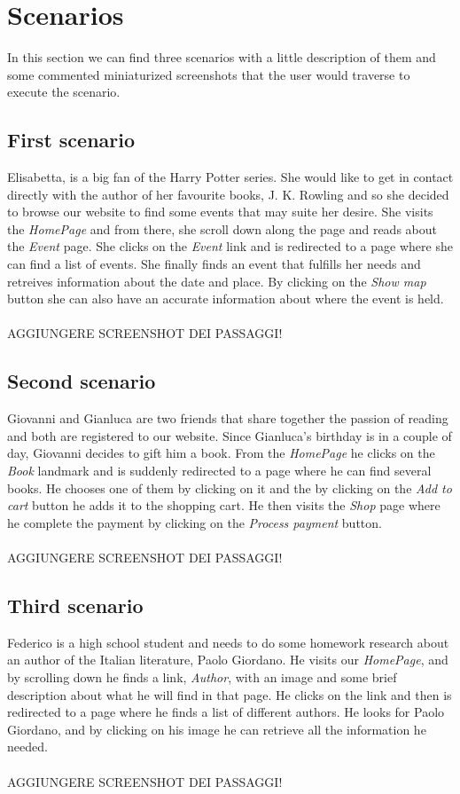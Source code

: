 \documentclass[12pt,a4paper]{article}
\begin{document}
\newpage
\section{Scenarios}
In this section we can find three scenarios with a little description of them and some commented miniaturized screenshots that the user would traverse to execute the scenario.
\subsection{First scenario}
Elisabetta, is a big fan of the Harry Potter series. She would like to get in contact directly with the author of her favourite books, J. K. Rowling and so she decided to browse our website to find some events that may suite her desire. She visits the \textit{HomePage} and from there, she scroll down along the page and reads about the \textit{Event} page. She clicks on the \textit{Event} link and is redirected to a page where she can find a list of events. She finally finds an event that fulfills her needs and retreives information about the date and place. By clicking on the \textit{Show map} button she can also have an accurate information about where the event is held.\\\\
AGGIUNGERE SCREENSHOT DEI PASSAGGI!
\subsection{Second scenario}
Giovanni and Gianluca are two friends that share together the passion of reading and both are registered to our website. Since Gianluca's birthday is in a couple of day, Giovanni decides to gift him a book. From the \textit{HomePage} he clicks on the \textit{Book} landmark and is suddenly redirected to a page where he can find several books. He chooses one of them by clicking on it and the by clicking on the \textit{Add to cart} button he adds it to the shopping cart. He then visits the \textit{Shop} page where he complete the payment by clicking on the \textit{Process payment} button.\\\\
AGGIUNGERE SCREENSHOT DEI PASSAGGI!
\subsection{Third scenario}
Federico is a high school student and needs to do some homework research about an author of the Italian literature, Paolo Giordano. He visits our \textit{HomePage}, and by scrolling down he finds a link, \textit{Author}, with an image and some brief description about what he will find in that page. He clicks on the link and then is redirected to a page where he finds a list of different authors. He looks for Paolo Giordano, and by clicking on his image he can retrieve all the information he needed.\\\\
AGGIUNGERE SCREENSHOT DEI PASSAGGI!
\end{document}
